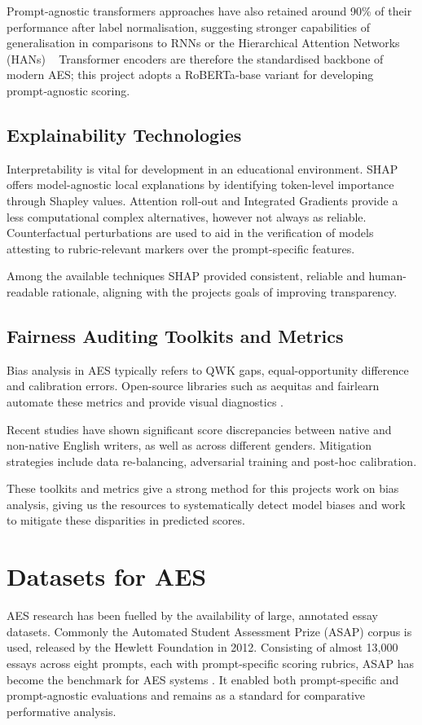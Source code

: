 \documentclass[12pt,a4paper]{report}
\begin{document}
Prompt-agnostic transformers approaches have also retained around 90\% of their performance after label normalisation, suggesting stronger capabilities of generalisation in comparisons to RNNs or the Hierarchical Attention Networks (HANs)
 
Transformer encoders are therefore the standardised backbone of modern AES; this project adopts a RoBERTa‑base variant for developing prompt‑agnostic scoring.

\subsection{Explainability Technologies}
Interpretability is vital for development in an educational environment. SHAP \citep{lundberg2017unified} offers model-agnostic local explanations by identifying token-level importance through Shapley values. Attention roll-out and Integrated Gradients provide a less computational complex alternatives, however not always as reliable. Counterfactual perturbations are used to aid in the verification of models attesting to rubric-relevant markers over the prompt-specific features.

Among the available techniques SHAP provided consistent, reliable and human-readable rationale, aligning with the projects goals of improving transparency.

\subsection{Fairness Auditing Toolkits and Metrics}
Bias analysis in AES typically refers to QWK gaps, equal-opportunity difference and calibration errors. Open-source libraries such as aequitas and fairlearn automate these metrics and  provide visual diagnostics \citep{litman2024fairness}. 

Recent studies have shown significant score discrepancies between native and non-native English writers, as well as across different genders\citep{blodgett2020language}. Mitigation strategies include data re-balancing, adversarial training and post-hoc calibration.

These toolkits and metrics give a strong method for this projects work on bias analysis, giving us the resources to systematically detect model biases and work to mitigate these disparities in predicted scores.


\section{Datasets for AES}
AES research has been fuelled by the availability of large, annotated essay datasets. Commonly the Automated Student Assessment Prize (ASAP) corpus is used, released by the Hewlett Foundation in 2012. Consisting of almost 13,000 essays across eight prompts, each with prompt-specific scoring rubrics, ASAP has become the benchmark for AES systems \citep{asap2012kaggle}. It enabled both prompt-specific and prompt-agnostic evaluations and remains as a standard for comparative performative analysis.
\end{document}
